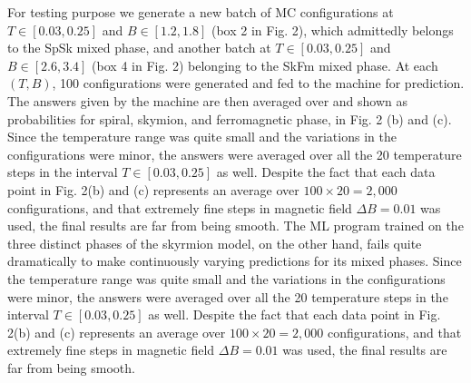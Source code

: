 \documentclass[reprint,amsmath,amssymb,aps,showpacs,onecolumn,superscriptaddress,prb]{revtex4-1}
\begin{document}
\begin{widetext}
For testing purpose we generate a new batch of MC configurations at $T\in [0.03, 0.25]$ and $B\in [1.2, 1.8]$ (box 2 in Fig. 2), which admittedly belongs to the SpSk mixed phase, and another batch at $T\in [0.03, 0.25]$ and $B\in [2.6,3.4]$ (box 4 in Fig. 2) belonging to the SkFm mixed phase. At each $(T,B)$, 100 configurations were generated and fed to the machine for prediction. The answers given by the machine are then averaged over and shown as probabilities for spiral, skymion, and ferromagnetic phase, in Fig. 2 (b) and (c). Since the temperature range was quite small and the variations in the configurations were minor, the answers were averaged over all the 20 temperature steps in the interval $T\in [0.03, 0.25]$ as well. Despite the fact that each data point in Fig. 2(b) and (c) represents an average over $100\times 20 = 2,000$ configurations, and that extremely fine steps in magnetic field $\Delta B= 0.01$ was used, the final results are far from being smooth. The ML program trained on the three distinct phases of the skyrmion model, on the other hand, fails quite dramatically to make continuously varying predictions for its mixed phases. Since the temperature range was quite small and the variations in the configurations were minor, the answers were averaged over all the 20 temperature steps in the interval $T\in [0.03, 0.25]$ as well. Despite the fact that each data point in Fig. 2(b) and (c) represents an average over $100\times 20 = 2,000$ configurations, and that extremely fine steps in magnetic field $\Delta B= 0.01$ was used, the final results are far from being smooth.



\end{widetext}
\end{document}

